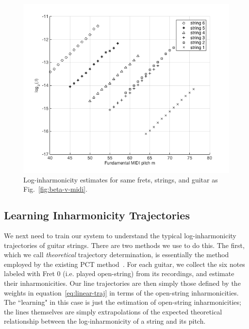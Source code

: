 \documentclass[12pt]{cmuthesis}
\begin{document}
\begin{figure}[!htbp] 
\centering
\includegraphics[scale=0.7]{log-beta-v-midi}
\caption{Log-inharmonicity estimates for same frets, strings, and guitar as Fig.~\ref{fig:beta-v-midi}.}
\label{fig:log-beta-v-midi}
\end{figure}

\subsection{Learning Inharmonicity Trajectories}
We next need to train our system to understand the typical log-inharmonicity trajectories of guitar strings. There are two methods we use to do this. The first, which we call \textit{theoretical} trajectory determination, is essentially the method employed by the existing PCT method~\cite{barbanchoi2012}. For each guitar, we collect the six notes labeled with Fret 0 (i.e. played open-string) from its recordings, and estimate their inharmonicities. Our line trajectories are then simply those defined by the weights in equation~\eqref{eq:linear-traj} in terms of the open-string inharmonicities. The ``learning" in this case is just the estimation of open-string inharmonicities; the lines themselves are simply extrapolations of the expected theoretical relationship between the log-inharmonicity of a string and its pitch.

\end{document}

